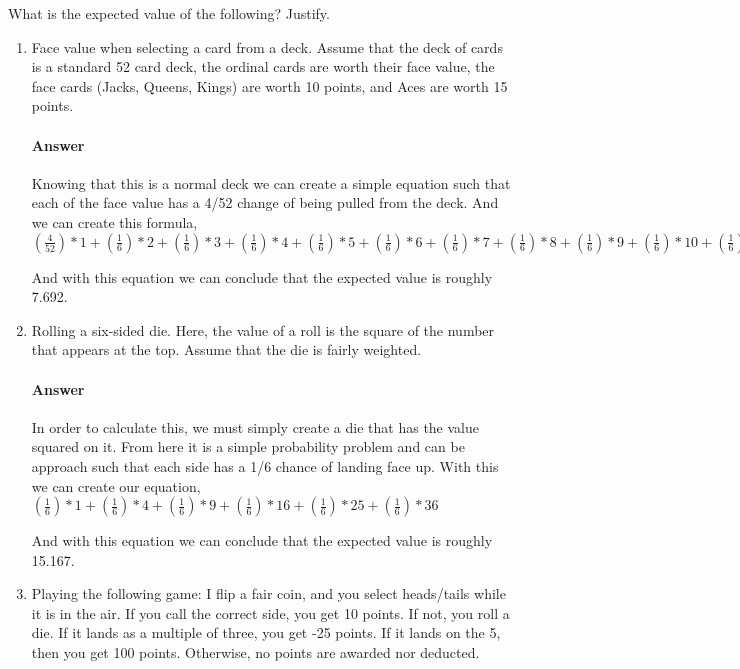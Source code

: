 \documentclass{article}
\begin{document}
 

What is the expected value of the following? Justify.

\begin{enumerate}
    \item Face value when selecting a card from a deck.  Assume that the deck of
        cards is a standard 52 card deck, the ordinal cards are worth their face
        value, the face cards (Jacks, Queens, Kings) are
        worth 10 points, and Aces are worth 15 points.
        \paragraph{Answer} Knowing that this is a normal deck we can create a simple equation such that each of the face value 
        has a 4/52 change of being pulled from the deck. And we can create this formula,
        $( \frac{4}{52} )*1+( \frac{1}{6} )*2+( \frac{1}{6} )*3+( \frac{1}{6} )*4+( \frac{1}{6} )*5+( \frac{1}{6} )*6+
        ( \frac{1}{6} )*7+( \frac{1}{6} )*8+( \frac{1}{6} )*9+( \frac{1}{6} )*10+( \frac{1}{6} )*10+( \frac{1}{6} )*10+
        ( \frac{1}{6} )*10+( \frac{1}{6} )*15$

        And with this equation we can conclude that the expected value is roughly 7.692.

    \item Rolling a six-sided die.  Here, the value of a roll is the square of
        the number that appears at the top.  Assume that the die is fairly
        weighted.
        \paragraph{Answer} In order to calculate this, we must simply create a die that has the value squared on it.
        From here it is a simple probability problem and can be approach such that each side has a 1/6
        chance of landing face up. With this we can create our equation,
        $( \frac{1}{6} )*1+( \frac{1}{6} )*4+( \frac{1}{6} )*9+( \frac{1}{6})*16+( \frac{1}{6} )*25+( \frac{1}{6} )*36$
        
        And with this equation we can conclude that the expected value is roughly 15.167.
    
    \item Playing the following game: I flip a fair coin, and you select
        heads/tails while it is in the air.  If you call the correct side,
        you get 10 points.  If not, you roll a die.  If it lands as a
        multiple of three, you get -25 points.
        If it lands on the 5, then you get 100 points.  Otherwise, no points are
        awarded nor deducted.

\end{enumerate}
\end{document}
